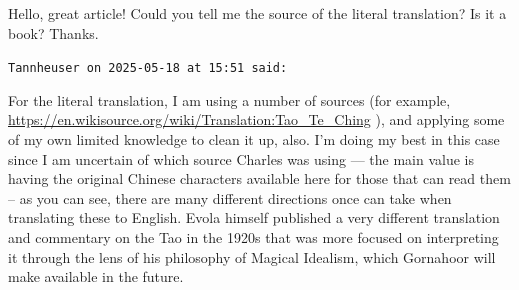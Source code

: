 \begin{footnotesize}
\begin{sffamily}
Hello, great article! Could you tell me the source of the literal translation? Is it a book? Thanks.

\hfill

\texttt{Tannheuser on 2025-05-18 at 15:51 said:}

For the literal translation, I am using a number of sources (for example, \url{https://en.wikisource.org/wiki/Translation:Tao_Te_Ching} ), and applying some of my own limited knowledge to clean it up, also. I'm doing my best in this case since I am uncertain of which source Charles was using --- the main value is having the original Chinese characters available here for those that can read them -- as you can see, there are many different directions once can take when translating these to English. Evola himself published a very different translation and commentary on the Tao in the 1920s that was more focused on interpreting it through the lens of his philosophy of Magical Idealism, which Gornahoor will make available in the future.

\end{sffamily}
\end{footnotesize}

